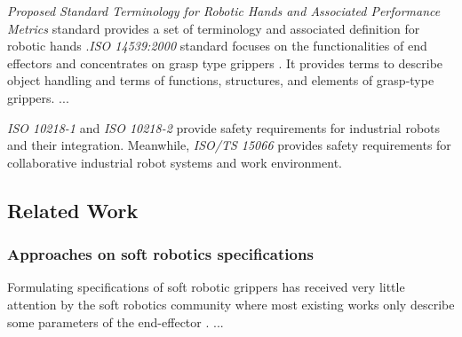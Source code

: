 \documentclass[lettersize,journal]{IEEEtran}
\begin{document}
\emph{Proposed Standard Terminology for Robotic Hands and Associated Performance Metrics} standard provides a set of terminology and associated definition for robotic hands \cite{Falco2018}.\emph{ISO 14539:2000} standard focuses on the functionalities of end effectors and concentrates on grasp type grippers \cite{ISO14539:2000}. It provides terms to describe object handling and terms of functions, structures, and elements of grasp-type grippers. ...


\emph{ISO 10218-1} and \emph{ISO 10218-2} provide safety requirements for industrial robots and their integration.
Meanwhile, \emph{ISO/TS 15066} provides safety requirements for collaborative industrial robot systems and work environment. 



\subsection{Related Work}\label{relatedwork}

\subsubsection{Approaches on soft robotics specifications} 
Formulating specifications of soft robotic grippers has received very little attention by the soft robotics community where most existing works only describe some parameters of the end-effector \cite{Hong2022,Bhattacharya2019,Tadakuma2020,Loh2014,Nishikawa2019,Mohan2020}.  ...
\end{document}
